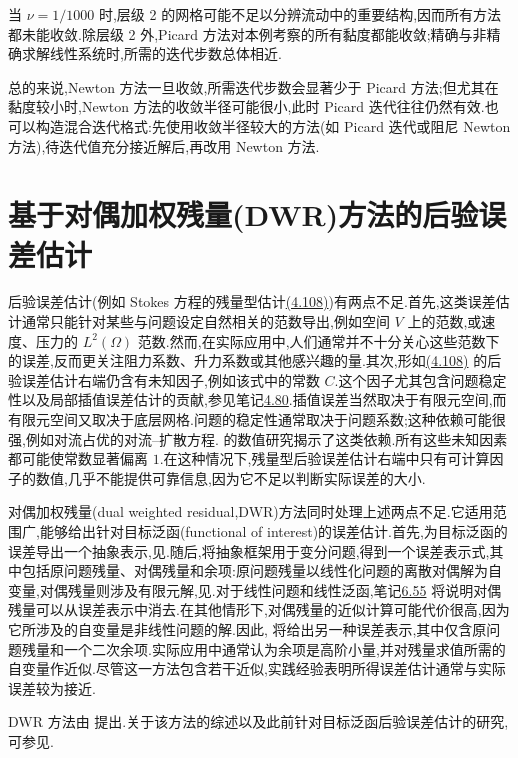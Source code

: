 \begin{example}
当 $\nu=1/1000$ 时,层级 2 的网格可能不足以分辨流动中的重要结构,因而所有方法都未能收敛.除层级 2 外,Picard 方法对本例考察的所有黏度都能收敛;精确与非精确求解线性系统时,所需的迭代步数总体相近.

总的来说,Newton 方法一旦收敛,所需迭代步数会显著少于 Picard 方法;但尤其在黏度较小时,Newton 方法的收敛半径可能很小,此时 Picard 迭代往往仍然有效.也可以构造混合迭代格式:先使用收敛半径较大的方法(如 Picard 迭代或阻尼 Newton 方法),待迭代值充分接近解后,再改用 Newton 方法.
\end{example}

\section{基于对偶加权残量(DWR)方法的后验误差估计}\label{sec:steady-ns-dwr}

\begin{note}[动机]\label{note:steady-ns-dwr-motivation}
后验误差估计(例如 Stokes 方程的残量型估计\hyperref[eq:stokes-residual-error-estimate]{(4.108)})有两点不足.首先,这类误差估计通常只能针对某些与问题设定自然相关的范数导出,例如空间 $V$ 上的范数,或速度、压力的 $L^2(\Omega)$ 范数.然而,在实际应用中,人们通常并不十分关心这些范数下的误差,反而更关注阻力系数、升力系数或其他感兴趣的量.其次,形如\hyperref[eq:stokes-residual-error-estimate]{(4.108)} 的后验误差估计右端仍含有未知因子,例如该式中的常数 $C$.这个因子尤其包含问题稳定性以及局部插值误差估计的贡献,参见笔记\hyperref[note:stokes-residual-global-upper-estimate]{4.80}.插值误差当然取决于有限元空间,而有限元空间又取决于底层网格.问题的稳定性通常取决于问题系数;这种依赖可能很强,例如对流占优的对流--扩散方程.\textcite{John2000} 的数值研究揭示了这类依赖.所有这些未知因素都可能使常数显著偏离 $1$.在这种情况下,残量型后验误差估计右端中只有可计算因子的数值,几乎不能提供可靠信息,因为它不足以判断实际误差的大小.

对偶加权残量(dual weighted residual,DWR)方法同时处理上述两点不足.它适用范围广,能够给出针对目标泛函(functional of interest)的误差估计.首先,为目标泛函的误差导出一个抽象表示,见.随后,将抽象框架用于变分问题,得到一个误差表示式,其中包括原问题残量、对偶残量和余项:原问题残量以线性化问题的离散对偶解为自变量,对偶残量则涉及有限元解,见.对于线性问题和线性泛函,笔记\hyperref[note:steady-ns-dwr-linear]{6.55} 将说明对偶残量可以从误差表示中消去.在其他情形下,对偶残量的近似计算可能代价很高,因为它所涉及的自变量是非线性问题的解.因此, 将给出另一种误差表示,其中仅含原问题残量和一个二次余项.实际应用中通常认为余项是高阶小量,并对残量求值所需的自变量作近似.尽管这一方法包含若干近似,实践经验表明所得误差估计通常与实际误差较为接近.

DWR 方法由\textcite{BeckerRannacher1996,BeckerRannacher1998} 提出.关于该方法的综述以及此前针对目标泛函后验误差估计的研究,可参见\textcite{BeckerRannacher2001,BangerthRannacher2003}.
\end{note}

